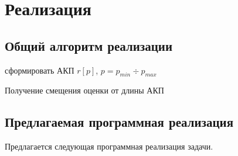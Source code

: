 
    \section{Реализация}

    \subsection{Общий алгоритм реализации}

    \begin{algorithm}
        сформировать АКП $r\left[p\right]$, $p = p_{min} \div p_{max}$\;
        \caption{Получение смещения оценки от длины АКП \label{algo:general}}
    \end{algorithm}

    \subsection{Предлагаемая программная реализация}

    Предлагается следующая программная реализация задачи.

